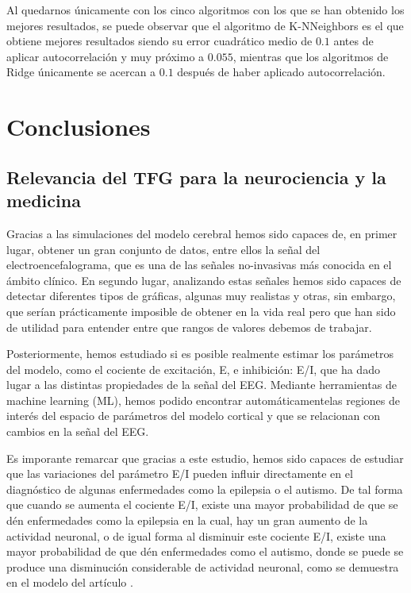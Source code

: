 \documentclass[oneside,openright,titlepage,numbers=noenddot,openany,headinclude,footinclude=true,
cleardoublepage=empty,abstractoff,BCOR=5mm,paper=a4,fontsize=12pt,main=spanish]{scrreprt}
\begin{document}
Al quedarnos únicamente con los cinco algoritmos con los que se han obtenido los mejores resultados, se puede observar que el algoritmo de K-NNeighbors es el que obtiene mejores resultados siendo su error cuadrático medio de $0.1$ antes de aplicar autocorrelación y muy próximo a $0.055$, mientras que los algoritmos de Ridge únicamente se acercan a $0.1$ después de haber aplicado autocorrelación.

\chapter{Conclusiones}\label{part:conclusiones}

\section{Relevancia del TFG para la neurociencia y la medicina}

Gracias a las simulaciones del modelo cerebral hemos sido capaces de, en primer lugar, obtener un gran conjunto de datos, entre ellos la señal del electroencefalograma, que es una de las señales no-invasivas más conocida en el ámbito clínico. En segundo lugar, analizando estas señales hemos sido capaces de detectar diferentes tipos de gráficas, algunas muy realistas y otras, sin embargo, que serían prácticamente imposible de obtener en la vida real pero que han sido de utilidad para entender entre que rangos de valores debemos de trabajar.

Posteriormente, hemos estudiado si es posible realmente estimar los parámetros del modelo, como el cociente de excitación, E, e inhibición: E/I, que ha dado lugar a las distintas propiedades de la señal del EEG. Mediante herramientas de machine learning (ML), hemos podido encontrar automáticamentelas  regiones de interés del espacio de parámetros del modelo cortical y que se relacionan con cambios en la señal del EEG.

Es imporante remarcar que gracias a este estudio, hemos sido capaces de estudiar que las variaciones del parámetro E/I pueden influir directamente en el diagnóstico de algunas enfermedades como la epilepsia o el autismo. De tal forma que cuando se aumenta el cociente E/I, existe una mayor probabilidad de que se dén enfermedades como la epilepsia en la cual, hay un gran aumento de la actividad neuronal, o de igual forma al disminuir este cociente E/I, existe una mayor probabilidad de que dén enfermedades como el autismo, donde se puede se produce una disminución considerable de actividad neuronal, como se demuestra en el modelo del artículo \cite{modelofautism}.
\end{document}
